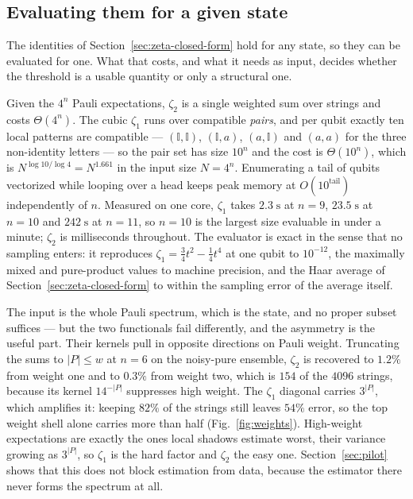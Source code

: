 \hypertarget{evaluating-them-for-a-given-state}{%
\subsection{\texorpdfstring{Evaluating them for a given state}{Evaluating them for a given state}}\label{sec:evaluation-cost}}

The identities of Section~\ref{sec:zeta-closed-form} hold for any state, so they can be
evaluated for one. What that costs, and what it needs as input, decides whether the threshold is
a usable quantity or only a structural one.

Given the \(4^n\) Pauli expectations, \(\zeta_2\) is a single weighted sum over strings and costs
\(\Theta(4^n)\). The cubic \(\zeta_1\) runs over compatible \emph{pairs}, and per qubit exactly
ten local patterns are compatible --- \((\mathbb{I},\mathbb{I})\), \((\mathbb{I},a)\),
\((a,\mathbb{I})\) and \((a,a)\) for the three non-identity letters --- so the pair set has size
\(10^n\) and the cost is \(\Theta(10^n)\), which is \(N^{\log 10/\log 4} = N^{1.661}\) in the
input size \(N = 4^n\). Enumerating a tail of qubits vectorized while looping over a head keeps
peak memory at \(O(10^{\text{tail}})\) independently of \(n\). Measured on one core, \(\zeta_1\)
takes \(2.3\;\mathrm{s}\) at \(n = 9\), \(23.5\;\mathrm{s}\) at \(n = 10\) and
\(242\;\mathrm{s}\) at \(n = 11\), so \(n = 10\) is the largest size evaluable in under a minute;
\(\zeta_2\) is milliseconds throughout. The evaluator is exact in the sense that no sampling
enters: it reproduces \(\zeta_1 = \tfrac34 t^2 - \tfrac14 t^4\) at one qubit to \(10^{-12}\), the
maximally mixed and pure-product values to machine precision, and the Haar average of
Section~\ref{sec:zeta-closed-form} to within the sampling error of the average itself.

The input is the whole Pauli spectrum, which is the state, and no proper subset suffices --- but
the two functionals fail differently, and the asymmetry is the useful part. Their kernels pull in
opposite directions on Pauli weight. Truncating the sums to \(|P| \le w\) at \(n = 6\) on the
noisy-pure ensemble, \(\zeta_2\) is recovered to \(1.2\%\) from weight one and to \(0.3\%\) from
weight two, which is \(154\) of the \(4096\) strings, because its kernel \(14^{-|P|}\) suppresses
high weight. The \(\zeta_1\) diagonal carries \(3^{|P|}\), which amplifies it: keeping \(82\%\)
of the strings still leaves \(54\%\) error, so the top weight shell alone carries more than half
(Fig.~\ref{fig:weights}). High-weight expectations are exactly the ones local shadows estimate
worst, their variance growing as \(3^{|P|}\), so \(\zeta_1\) is the hard factor and \(\zeta_2\)
the easy one. Section~\ref{sec:pilot} shows that this does not block estimation from data,
because the estimator there never forms the spectrum at all.

